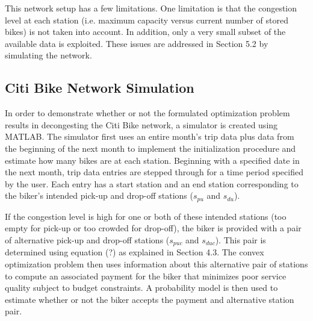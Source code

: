 \documentclass[times, 10pt,twocolumn]{article}
\begin{document}
This network setup has a few limitations. One limitation is that the congestion level at each station (i.e. maximum capacity versus current number of stored bikes) is not taken into account. In addition, only a very small subset of the available data is exploited. These issues are addressed in Section 5.2 by simulating the network.

\subsection{Citi Bike Network Simulation}

In order to demonstrate whether or not the formulated optimization problem results in decongesting the Citi Bike network, a simulator is created using MATLAB. The simulator first uses an entire month's trip data plus data from the beginning of the next month to implement the initialization procedure and estimate how many bikes are at each station. Beginning with a specified date in the next month, trip data entries are stepped through for a time period specified by the user. Each entry has a start station and an end station corresponding to the biker's intended pick-up and drop-off stations ($s_{pu}$ and $s_{du}$).

If the congestion level is high for one or both of these intended stations (too empty for pick-up or too crowded for drop-off), the biker is provided with a pair of alternative pick-up and drop-off stations ($s_{puc}$ and $s_{duc}$). This pair is determined using equation (?) as explained in Section 4.3. The convex optimization problem then uses information about this alternative pair of stations to compute an associated payment for the biker that minimizes poor service quality subject to budget constraints. A probability model is then used to estimate whether or not the biker accepts the payment and alternative station pair.
\end{document}
